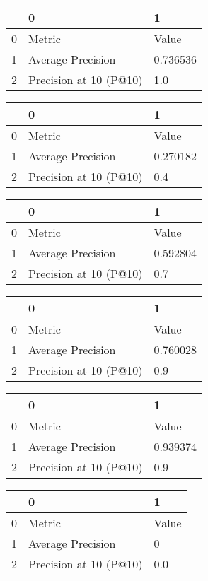 \begin{tabular}{lll}
\toprule
{} &                       0 &         1 \\
\midrule
0 &                  Metric &     Value \\
1 &       Average Precision &  0.736536 \\
2 &  Precision at 10 (P@10) &       1.0 \\
\bottomrule
\end{tabular}

\begin{tabular}{lll}
\toprule
{} &                       0 &         1 \\
\midrule
0 &                  Metric &     Value \\
1 &       Average Precision &  0.270182 \\
2 &  Precision at 10 (P@10) &       0.4 \\
\bottomrule
\end{tabular}

\begin{tabular}{lll}
\toprule
{} &                       0 &         1 \\
\midrule
0 &                  Metric &     Value \\
1 &       Average Precision &  0.592804 \\
2 &  Precision at 10 (P@10) &       0.7 \\
\bottomrule
\end{tabular}

\begin{tabular}{lll}
\toprule
{} &                       0 &         1 \\
\midrule
0 &                  Metric &     Value \\
1 &       Average Precision &  0.760028 \\
2 &  Precision at 10 (P@10) &       0.9 \\
\bottomrule
\end{tabular}

\begin{tabular}{lll}
\toprule
{} &                       0 &         1 \\
\midrule
0 &                  Metric &     Value \\
1 &       Average Precision &  0.939374 \\
2 &  Precision at 10 (P@10) &       0.9 \\
\bottomrule
\end{tabular}


\begin{tabular}{lll}
\toprule
{} &                       0 &      1 \\
\midrule
0 &                  Metric &  Value \\
1 &       Average Precision &      0 \\
2 &  Precision at 10 (P@10) &    0.0 \\
\bottomrule
\end{tabular}

